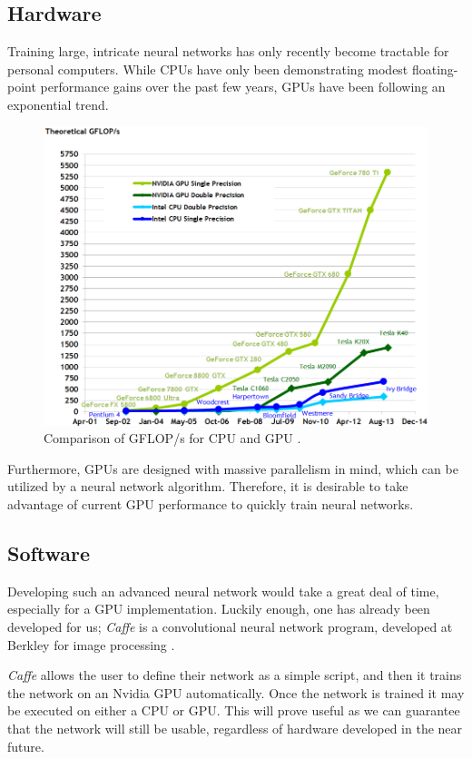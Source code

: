 \documentclass[twoside]{article}
\begin{document}
\begin{multicols}{2}
\subsection{Hardware}
Training large, intricate neural networks has only recently become tractable for personal computers. While CPUs have only been demonstrating modest floating-point performance gains over the past few years, GPUs have been following an exponential trend. 
\begin{figure}[H]
	\includegraphics[width=\linewidth]{images/ops}
	\caption{Comparison of GFLOP/s for CPU and GPU \cite{nvidia}.}
\end{figure}
Furthermore, GPUs are designed with massive parallelism in mind, which can be utilized by a neural network algorithm. Therefore, it is desirable to take advantage of current GPU performance to quickly train neural networks. 

\subsection{Software}
Developing such an advanced neural network would take a great deal of time, especially for a GPU implementation. Luckily enough, one has already been developed for us; \textit{Caffe} is a convolutional neural network program, developed at Berkley for image processing \cite{caffe}. \par \textit{Caffe} allows the user to define their network as a simple script, and then it trains the network on an Nvidia GPU automatically. Once the network is trained it may be executed on either a CPU or GPU. This will prove useful as we can guarantee that the network will still be usable, regardless of hardware developed in the near future.

\end{multicols}

	
	
\end{document}

